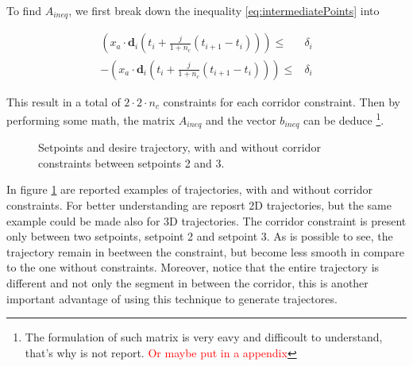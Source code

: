\noindent To find $A_{ineq}$, we first break down the inequality \eqref{eq:intermediatePoints} into

\begin{align}
	(x_a\cdot\mathbf{d}_i(t_i+\frac{j}{1+n_c}(t_{i+1}-t_i)))\le & \delta_i \\
	-(x_a\cdot\mathbf{d}_i(t_i+\frac{j}{1+n_c}(t_{i+1}-t_i)))\le & \delta_i
	\label{eq:breakConstraint}
\end{align}

\noindent This result in a total of $2\cdot2\cdot n_c$ constraints for each corridor constraint. Then by performing some math, the matrix $A_{ineq}$ and the vector $b_{ineq}$ can be deduce \footnote{The formulation of such matrix is very eavy and difficoult to understand, that's why is not report. \textcolor{red}{Or maybe put in a appendix}}.

\begin{figure}[h]
	\centering
 	
 	\caption{Setpoints and desire trajectory, with and without corridor constraints between setpoints 2 and 3.}
 	\label{fig:trajectory}		
\end{figure}

\noindent In figure \ref{fig:trajectory} are reported examples of trajectories, with and without corridor constraints. For better understanding are reposrt 2D trajectories, but the same example could be made also for 3D trajectories. The corridor constraint is present only between two setpoints, setpoint 2 and setpoint 3. As is possible to see, the trajectory remain in beetween the constraint, but become less smooth in compare to the one without constraints. Moreover, notice that the entire trajectory is different and not only the segment in between the corridor, this is another important advantage of using this technique to generate trajectores. 

